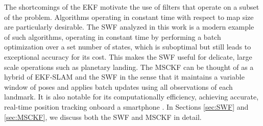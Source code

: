 \documentclass[letterpaper, 10 pt, conference]{ieeeconf}  %
\begin{document}
The shortcomings of the EKF motivate the use of filters that operate on a subset of the problem. Algorithms operating in constant time with respect to map size are particularly desirable.
The SWF analyzed in this work is a modern example of such algorithms, operating in constant time by performing a batch optimization over a set number of states, which is suboptimal but still leads to exceptional accuracy for its cost.
This makes the SWF useful for delicate, large scale operations such as planetary landing\cite{Sibley:2010:JFR}. 
The MSCKF \cite{Mourikis:2006:TechReport,Mourikis:2007:ICRA} can be thought of as a hybrid of EKF-SLAM and the SWF in the sense that it maintains a variable window of poses and applies batch updates using all observations of each landmark. It is also notable for its computationally efficiency, achieving accurate, real-time position tracking onboard a smartphone \cite{Li:2013:ICRA}.
In Sections \ref{sec:SWF} and \ref{sec:MSCKF}, we discuss both the SWF and MSCKF in detail.


\end{document}

